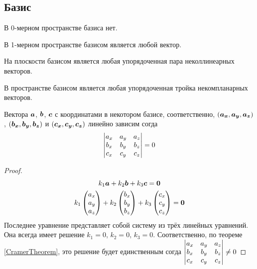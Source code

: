 \subsection{Базис}

\begin{proposition}
    В 0-мерном пространстве базиса нет.
\end{proposition}

\begin{proposition}
    В 1-мерном пространстве базисом является любой вектор.
\end{proposition}

\begin{proposition}
    На плоскости базисом является любая упорядоченная пара неколлинеарных векторов.
\end{proposition}

\begin{proposition}
    В пространстве базисом является любая упорядоченная тройка некомпланарных векторов.
\end{proposition}


\begin{theorem}
    Вектора $\bm{a}$, $\bm{b}$, $\bm{c}$ с координатами в некотором базисе, соответственно, $(\bm{a_x}, \bm{a_y}, \bm{a_z})$, $(\bm{b_x}, \bm{b_y}, \bm{b_z})$ и $(\bm{c_x}, \bm{c_y}, \bm{c_z})$ линейно зависим согда
    \[ 
        \left\lvert \begin{matrix}
            a_x & a_y & a_z \\
            b_x & b_y & b_z \\
            c_x & c_y & c_z
        \end{matrix} \right\rvert = 0
    \]
\end{theorem}
\begin{proof}
    \begin{gather*}
        k_1 \bm{a} + k_2 \bm{b} + k_3 \bm{c} = \bm{0} \\
        k_1 \begin{pmatrix} a_x \\ a_y \\ a_z \end{pmatrix} + k_2 \begin{pmatrix} b_x \\ b_y \\ b_z \end{pmatrix} + k_3 \begin{pmatrix} c_x \\ c_y \\ c_z \end{pmatrix} = \bm{0}
    \end{gather*}
    Последнее уравнение представляет собой систему из трёх линейных уравнений. Она всегда имеет решение $k_1 = 0$, $k_2 = 0$, $k_3 = 0$. Соответственно, по теореме \ref{CramerTheorem}, это решение будет единственным согда $\left\lvert \begin{matrix}
        a_x & a_y & a_z \\
        b_x & b_y & b_z \\
        c_x & c_y & c_z
    \end{matrix} \right\rvert \ne 0$
\end{proof}

